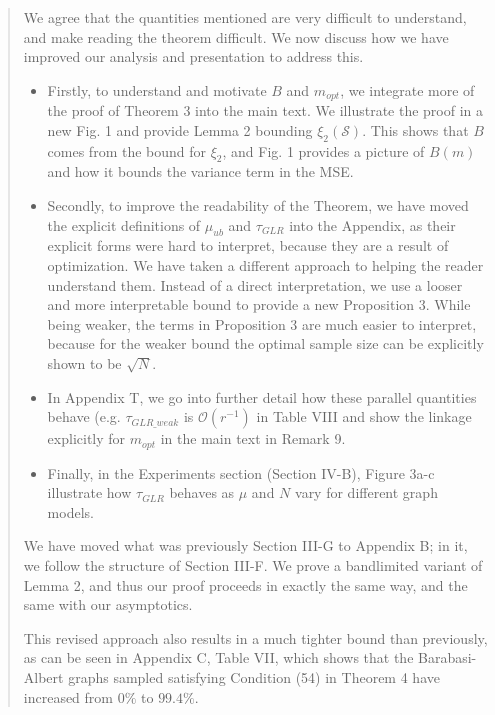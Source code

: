 \documentclass[11pt,onecolumn,journal]{IEEEtran}
\theoremstyle{definition}
\newcommand{\set}[1]{\mathcal{#1}}
\begin{document}
\begin{quote}
We agree that the quantities mentioned are very difficult to understand, and make reading the theorem difficult. We now discuss how we have improved our analysis and presentation to address this.
\begin{itemize}
    \item Firstly, to understand and motivate $B$ and $m_{opt}$, we integrate more of the proof of Theorem 3 into the main text. We illustrate the proof in a new Fig. 1 and provide Lemma 2 bounding $\xi_{2}(\set{S})$. This shows that $B$ comes from the bound for $\xi_{2}$, and Fig. 1 provides a picture of $B(m)$ and how it bounds the variance term in the MSE.
    \item Secondly, to improve the readability of the Theorem, we have moved the explicit definitions of $\mu_{ub}$ and $\tau_{GLR}$ into the Appendix, as their explicit forms were hard to interpret, because they are a result of optimization. We have taken a different approach to helping the reader understand them. Instead of a direct interpretation, we use a looser and more interpretable bound to provide a new Proposition 3. While being weaker, the terms in Proposition 3 are much easier to interpret, because for the weaker bound the optimal sample size can be explicitly shown to be $\sqrt{N}$.
    \item In Appendix T, we go into further detail how these parallel quantities behave (e.g. $\tau_{GLR\_weak}$ is $\mathcal{O}(r^{-1})$ in Table VIII and show the linkage explicitly for $m_{opt}$ in the main text in Remark 9. 
    \item Finally, in the Experiments section (Section IV-B), Figure 3a-c illustrate how $\tau_{GLR}$ behaves as $\mu$ and $N$ vary for different graph models.
\end{itemize}

We have moved what was previously Section III-G to Appendix B; in it, we follow the structure of Section III-F. We prove a bandlimited variant of Lemma 2, and thus our proof proceeds in exactly the same way, and the same with our asymptotics. 


This revised approach also results in a much tighter bound than previously, as can be seen in Appendix C, Table VII, which shows that the Barabasi-Albert graphs sampled satisfying Condition (54) in Theorem 4 have increased from $0\%$ to $99.4\%$.



\end{quote}
\end{document}
